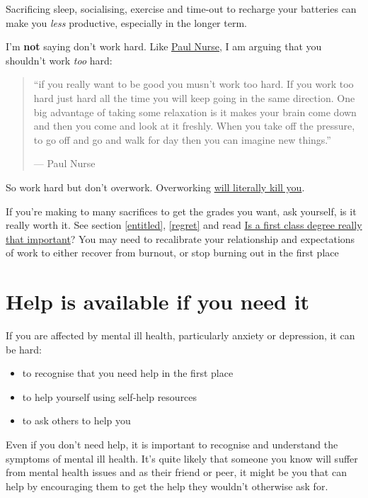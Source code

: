 \documentclass[
]{book}
\providecommand{\tightlist}{%
  \setlength{\itemsep}{0pt}\setlength{\parskip}{0pt}}
\begin{document}
Sacrificing sleep, socialising, exercise and time-out to recharge your batteries can make you \emph{less} productive, especially in the longer term.

I'm \textbf{not} saying don't work hard. Like \href{https://en.wikipedia.org/wiki/Paul_Nurse}{Paul Nurse}, I am arguing that you shouldn't work \emph{too} hard:

\begin{quote}
``if you really want to be good you musn't work too hard. If you work too hard just hard all the
time you will keep going in the same direction. One big advantage of taking some relaxation is it
makes your brain come down and then you come and look at it freshly. When you take off the
pressure, to go off and go and walk for day then you can imagine new things.''

\hfill --- Paul Nurse \citep{paulnurse}
\end{quote}

So work hard but don't overwork. Overworking \href{https://www.bbc.com/worklife/article/20210518-how-overwork-is-literally-killing-us}{will literally kill you}. \citep{overworking}

If you're making to many sacrifices to get the grades you want, ask yourself, is it really worth it. See section \ref{entitled}, \ref{regret} and read \href{https://on.ft.com/3Cc4Ynh}{Is a first class degree really that important}? You may need to recalibrate your relationship and expectations of work to either recover from burnout, or stop burning out in the first place \citep{happyburnout}

\hypertarget{notalone}{%
\section{Help is available if you need it}\label{notalone}}

If you are affected by mental ill health, particularly anxiety or depression, it can be hard:

\begin{itemize}
\tightlist
\item
  to recognise that you need help in the first place
\item
  to help yourself using self-help resources
\item
  to ask others to help you
\end{itemize}

Even if you don't need help, it is important to recognise and understand the symptoms of mental ill health. It's quite likely that someone you know will suffer from mental health issues and as their friend or peer, it might be you that can help by encouraging them to get the help they wouldn't otherwise ask for.
\end{document}
